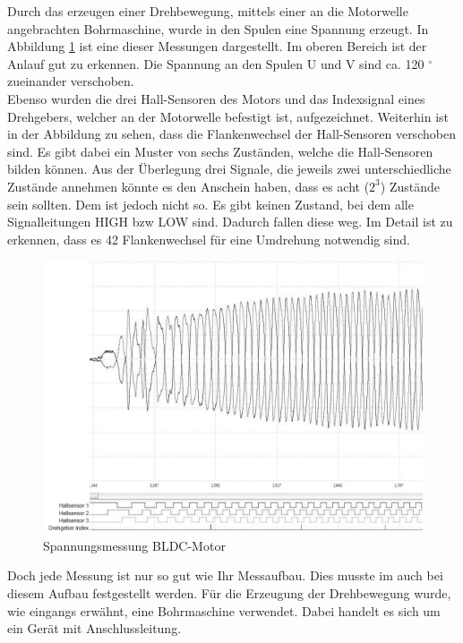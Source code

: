 Durch das erzeugen einer Drehbewegung, mittels einer an die Motorwelle angebrachten Bohrmaschine, wurde in den Spulen eine Spannung erzeugt.
In Abbildung \ref{fig:Spannungsmessung_BLDC_Motor} ist eine dieser Messungen dargestellt.
Im oberen Bereich ist der Anlauf gut zu erkennen.
Die Spannung an den Spulen U und V sind ca. 120 $^\circ$ zueinander verschoben.\\


Ebenso wurden die drei Hall-Sensoren des Motors und das Indexsignal eines Drehgebers, welcher an der Motorwelle befestigt ist, aufgezeichnet.
Weiterhin ist in der Abbildung zu sehen, dass die Flankenwechsel der Hall-Sensoren verschoben sind.
Es gibt dabei ein Muster von sechs Zuständen, welche die Hall-Sensoren bilden können.
Aus der Überlegung drei Signale, die jeweils zwei unterschiedliche Zustände annehmen könnte es den Anschein haben, dass es acht ($2^3$) Zustände sein sollten.
Dem ist jedoch nicht so. 
Es gibt keinen Zustand, bei dem alle Signalleitungen HIGH bzw LOW sind. Dadurch fallen diese weg.
Im Detail ist zu erkennen, dass es 42 Flankenwechsel für eine Umdrehung notwendig sind.

\begin{figure}[htbp]
	\centering
	\includegraphics[width=\textwidth-2cm]{tests/graphics/Spannungssignal_Messung}
	\caption{Spannungsmessung BLDC-Motor}
	\label{fig:Spannungsmessung_BLDC_Motor}
\end{figure}


Doch jede Messung ist nur so gut wie Ihr Messaufbau.
Dies musste im auch bei diesem Aufbau festgestellt werden.
Für die Erzeugung der Drehbewegung wurde, wie eingangs erwähnt, eine Bohrmaschine verwendet.
Dabei handelt es sich um ein Gerät mit Anschlussleitung.\\


